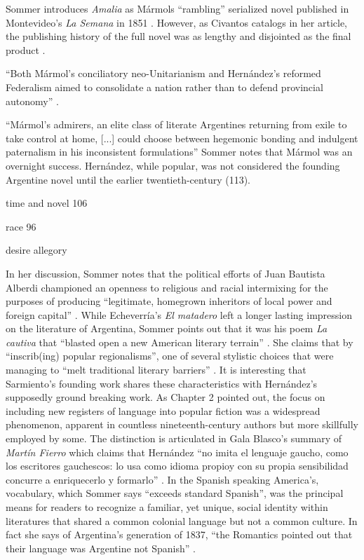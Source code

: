 Sommer introduces \textit{Amalia} as Mármols \enquote{rambling} serialized novel published in Montevideo's \textit{La Semana} in 1851 \autocite[83]{Sommer1991}.
However, as Civantos catalogs in her article, the publishing history of the full novel was as lengthy and disjointed as the final product \autocite[74]{Civantos2000}. 

\enquote{Both Mármol's conciliatory neo-Unitarianism and Hernández's reformed Federalism aimed to consolidate a nation rather than to defend provincial autonomy} \autocite[111-2]{Sommer1991}.

\enquote{Mármol's admirers, an elite class of literate Argentines returning from exile to take control at home, [...] could choose between hegemonic bonding and indulgent paternalism in his inconsistent formulations} \autocite[113]{Sommer1991}
Sommer notes that Mármol was an overnight success. 
Hernández, while popular, was not considered the founding Argentine novel until the earlier twentieth-century (113).

time and novel 106

race 96

desire allegory 


 
In her discussion, Sommer notes that the political efforts of Juan Bautista Alberdi championed an openness to religious and racial intermixing for the purposes of producing \enquote{legitimate, homegrown inheritors of local power and foreign capital} \autocite[103]{Sommer1991}.
While Echeverría's \textit{El matadero} left a longer lasting impression on the literature of Argentina, Sommer points out that it was his poem \textit{La cautiva} that \enquote{blasted open a new American literary terrain} \autocite[104]{Sommer1991}.
She claims that by \enquote{inscrib(ing) popular regionalisms}, one of several stylistic choices that were managing to \enquote{melt traditional literary barriers} \autocite[104]{Sommer1991}.
It is interesting that Sarmiento's founding work shares these characteristics with Hernández's supposedly ground breaking work.
As Chapter 2 pointed out, the focus on including new registers of language into popular fiction was a widespread phenomenon, apparent in countless nineteenth-century authors but more skillfully employed by some.
The distinction is articulated in Gala Blasco's summary of \textit{Martín Fierro} which claims that Hernández \enquote{no imita el lenguaje gaucho, como los escritores gauchescos: lo usa como idioma propioy con su propia sensibilidad concurre a enriquecerlo y formarlo} \autocite[400]{Blasco1991}.
In the Spanish speaking America's, vocabulary, which Sommer says \enquote{exceeds standard Spanish}, was the principal means for readers to recognize a familiar, yet unique, social identity within literatures that shared a common colonial language but not a common culture.
In fact she says of Argentina's generation of 1837, \enquote{the Romantics pointed out that their language was Argentine not Spanish} \autocite[105]{Sommer1991}.

